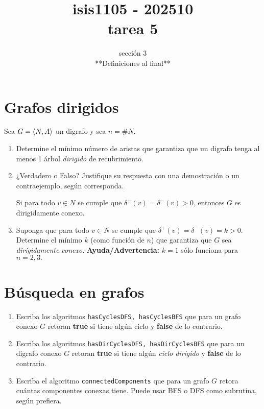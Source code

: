 \documentclass{amsart}
\title{isis1105 - 202510 \\ tarea 5}
\author{sección 3 \\ **Definiciones al final**}
\begin{document}
\maketitle

\begin{large}

\section{Grafos dirigidos}

Sea $G = \langle N, A \rangle$ un digrafo y sea $n = \#N$.

\begin{enumerate}
    \item Determine el mínimo número de aristas que garantiza que un digrafo tenga al menos 1 árbol \emph{dirigido} de recubrimiento.
    \item ¿Verdadero o Falso? Justifique su respuesta con una demostración o un contraejemplo, según corresponda.
        \begin{afir}
            Si para todo $v \in N$ se cumple que $\delta^+(v) = \delta^-(v) > 0$, entonces $G$ es dirigidamente conexo.
        \end{afir}
    \item Suponga que para todo $v \in N$ se cumple que $\delta^+(v) = \delta^-(v) = k > 0$. Determine el mínimo $k$ (como función de $n$) que garantiza que $G$ sea \emph{dirigidamente conexo}. \textbf{Ayuda/Advertencia:} $k=1$ sólo funciona para $n=2,3.$
\end{enumerate}

\section{Búsqueda en grafos}

\begin{enumerate}
    \item Escriba los algoritmos \texttt{hasCyclesDFS, hasCyclesBFS} que para un grafo conexo $G$ retoran \textbf{true} si tiene algún ciclo y \textbf{false} de lo contrario.
    \item Escriba los algoritmos \texttt{hasDirCyclesDFS, hasDirCyclesBFS} que para un digrafo conexo $G$ retoran \textbf{true} si tiene algún \emph{ciclo dirigido} y \textbf{false} de lo contrario.
    \item Escriba el algoritmo \texttt{connectedComponents} que para un grafo $G$ retora cuántas componentes conexas tiene. Puede usar BFS o DFS como subrutina, según prefiera.
\end{enumerate}


\end{large}
\end{document}
